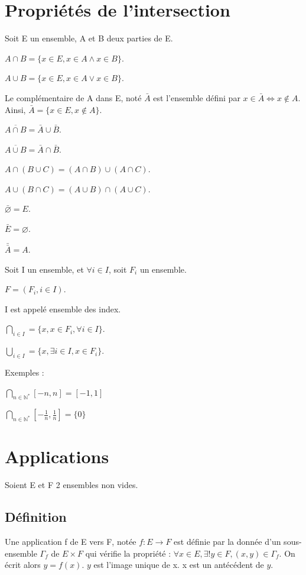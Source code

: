 \documentclass[french]{yLectureNote}
\begin{document}
\section{Propriétés de l'intersection}
Soit E un ensemble, A et B deux parties de E.

$A \cap B = \{x\in E, x\in A \wedge x\in B\}$.

$A \cup B = \{x\in E, x\in A \vee x\in B\}$.

\begin{theorem}[Def]
Le complémentaire de A dans E, noté $\bar{A}$ est l'ensemble défini par $x\in \bar{A} \iff x \notin A$. Ainsi, $\bar{A} = \{x\in E, x\notin A\}$.
\end{theorem}
\begin{theorem}[Propriétés]
$\overline{A\cap B} = \bar{A} \cup \bar{B}$.

$\overline{A\cup B} = \bar{A} \cap \bar{B}$.

$A\cap(B\cup C) = (A\cap B)\cup (A\cap C)$.

$A\cup (B\cap C) = (A\cup B)\cap (A\cup C)$.

$\bar{\varnothing} = E$.

$\bar{E} = \varnothing$.

$\bar{\bar{A}} = A$.
\end{theorem}

\begin{theorem}[Definition]
Soit I un ensemble, et $\forall i\in I$, soit $F_i$ un ensemble.

$F = (F_i, i\in I)$.

I est appelé ensemble des index.

$\bigcap\limits_{i\in I} = \{x, x\in F_i, \forall i \in I\}$.

$\bigcup\limits_{i\in I} = \{x, \exists i\in I, x\in F_i\}$.
\end{theorem}
Exemples :

$\bigcap\limits_{n\in \mathbb{N}^*} [-n, n] = [-1,1]$

$\bigcap\limits_{n\in \mathbb{N}^*} [-\frac{1}{n}, \frac{1}{n}] = \{0\}$

\section{Applications}
Soient E et F 2 ensembles non vides.
\subsection{Définition}
\begin{theorem}[Definition]
Une application f de E vers F, notée $f:E \rightarrow F$ est définie par la donnée d'un sous-ensemble $\Gamma_f$ de $E \times F$ qui vérifie la propriété : $\forall x \in E, \exists!y\in F, (x,y)\in \Gamma_f$. On écrit alors $y = f(x)$. $y$ est l'image unique de x. x est un antécédent de $y$.
\end{theorem}
\end{document}

